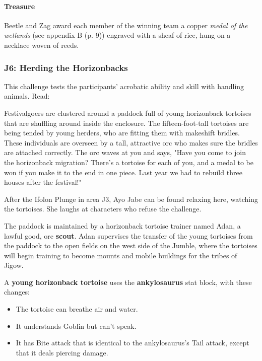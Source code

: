 \documentclass[letterpaper, 11pt, bg=full, twocolumn]{dndbook}
\begin{document}
\paragraph{Treasure}

Beetle and Zag award each member of the winning team a copper \textit{medal of the wetlands} (see appendix B (p. 9)) engraved with a sheaf of rice, hung on a necklace woven of reeds.

\subsubsection{J6: Herding the Horizonbacks}

This challenge tests the participants' acrobatic ability and skill with handling animals. Read:

\begin{DndReadAloud}
Festivalgoers are clustered around a paddock full of young horizonback tortoises that are shuffling around inside the enclosure. The fifteen-foot-tall tortoises are being tended by young herders, who are fitting them with makeshift bridles. These individuals are overseen by a tall, attractive orc who makes sure the bridles are attached correctly.
The orc waves at you and says, "Have you come to join the horizonback migration? There's a tortoise for each of you, and a medal to be won if you make it to the end in one piece. Last year we had to rebuild three houses after the festival!"
\end{DndReadAloud}

After the Ifolon Plunge in area J3, Ayo Jabe can be found relaxing here, watching the tortoises. She laughs at characters who refuse the challenge.

The paddock is maintained by a horizonback tortoise trainer named Adan, a lawful good, orc \textbf{scout}. Adan supervises the transfer of the young tortoises from the paddock to the open fields on the west side of the Jumble, where the tortoises will begin training to become mounts and mobile buildings for the tribes of Jigow.

A \textbf{young horizonback tortoise} uses the \textbf{ankylosaurus} stat block, with these changes:

\begin{itemize}
\item The tortoise can breathe air and water.
\item It understands Goblin but can't speak.
\item It has Bite attack that is identical to the ankylosaurus's Tail attack, except that it deals piercing damage.
\end{itemize}
\end{document}
